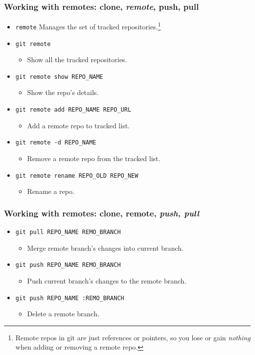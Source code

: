 \documentclass[11pt,ignorenonframetext,]{beamer}
\begin{document}
\begin{frame}[fragile]\frametitle{Working with \textbf{remotes}: clone,
\emph{remote}, push, pull}

\begin{itemize}
\item
  \texttt{remote} Manages the set of tracked repositories.\footnote{Remote
    repos in git are just references or pointers, so you lose or gain
    \emph{nothing} when adding or removing a remote repo.}
\item
  \texttt{git remote}
  \begin{itemize}
  \item
    Show all the tracked repositories.
  \end{itemize}
\item
  \texttt{git remote show REPO\_NAME}
  \begin{itemize}
  \item
    Show the repo's details.
  \end{itemize}
\item
  \texttt{git remote add REPO\_NAME REPO\_URL}
  \begin{itemize}
  \item
    Add a remote repo to tracked list.
  \end{itemize}
\item
  \texttt{git remote -d REPO\_NAME}
  \begin{itemize}
  \item
    Remove a remote repo from the tracked list.
  \end{itemize}
\item
  \texttt{git remote rename REPO\_OLD REPO\_NEW}
  \begin{itemize}
  \item
    Rename a repo.
  \end{itemize}
\end{itemize}
\end{frame}

\begin{frame}[fragile]\frametitle{Working with \textbf{remotes}: clone,
remote, \emph{push, pull}}

\begin{itemize}
\item
  \texttt{git pull REPO\_NAME REMO\_BRANCH}
  \begin{itemize}
  \item
    Merge remote branch's changes into current branch.
  \end{itemize}
\item
  \texttt{git push REPO\_NAME REMO\_BRANCH}
  \begin{itemize}
  \item
    Push current branch's changes to the remote branch.
  \end{itemize}
\item
  \texttt{git push REPO\_NAME :REMO\_BRANCH}
  \begin{itemize}
  \item
    Delete a remote branch.
  \end{itemize}
\end{itemize}
\end{frame}
\end{document}
